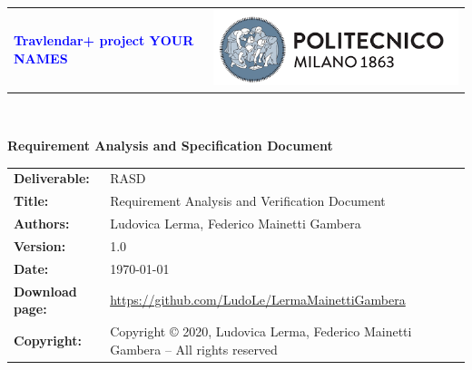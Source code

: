 


        \begin{titlepage}
                {\begin{table}[t!]
                \centering
                \begin{tabu} to \textwidth { X[1.3,r,p] X[1.7,l,p] }
                \textcolor{Blue}
                {\textbf{\small{Travlendar+ project YOUR NAMES}}} & \includegraphics[scale=0.5]{Images/PolimiLogo}
                \end{tabu}
                \end{table}}~\\ [7cm]

                \begin{flushleft}
                {\textbf{\Huge{Requirement Analysis and Specification Document}}} \\ [1cm]
                \end{flushleft}
        \end{titlepage}

        \begin{table}[h!]
                \begin{tabu} to \textwidth { X[0.3,r,p] X[0.7,l,p] }
                \hline
                
                \textbf{Deliverable:} & RASD\\
                \textbf{Title:} & Requirement Analysis and Verification Document \\
                \textbf{Authors:} & Ludovica Lerma, Federico Mainetti Gambera \\
                \textbf{Version:} & 1.0 \\ 
                \textbf{Date:} & \today \\
                \textbf{Download page:} & \url{https://github.com/LudoLe/LermaMainettiGambera}\\
                \textbf{Copyright:} & Copyright © 2020, Ludovica Lerma, Federico Mainetti Gambera – All rights reserved \\
                \hline
                \end{tabu}
        \end{table}

